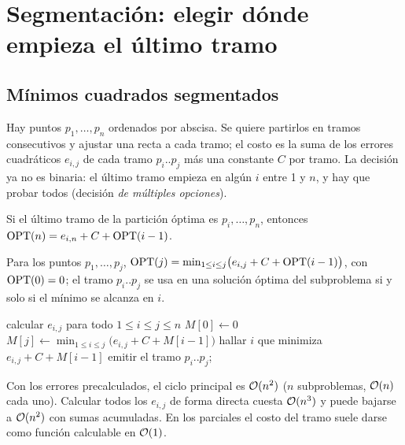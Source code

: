 \section{Segmentación: elegir dónde empieza el último tramo}

\subsection{Mínimos cuadrados segmentados}

Hay puntos $p_1,\dots,p_n$ ordenados por abscisa. Se quiere partirlos en
tramos consecutivos y ajustar una recta a cada tramo; el costo es la suma de
los errores cuadráticos $e_{i,j}$ de cada tramo $p_i..p_j$ más una constante
$C$ por tramo. La decisión ya no es binaria: el último tramo empieza en
algún $i$ entre 1 y $n$, y hay que probar todos (decisión \emph{de múltiples
opciones}).

\begin{resultado}[(6.6)]
Si el último tramo de la partición óptima es $p_i,\dots,p_n$, entonces
$\mathrm{OPT}(n)=e_{i,n}+C+\mathrm{OPT}(i-1)$.
\end{resultado}

\begin{resultado}[(6.7)]
Para los puntos $p_1,\dots,p_j$,
$\mathrm{OPT}(j)=\min_{1\le i\le j}\bigl(e_{i,j}+C+\mathrm{OPT}(i-1)\bigr)$, con
$\mathrm{OPT}(0)=0$; el tramo $p_i..p_j$ se usa en una solución óptima del
subproblema si y solo si el mínimo se alcanza en $i$.
\end{resultado}

\begin{algorithmic}[1]
\State calcular $e_{i,j}$ para todo $1\le i\le j\le n$
\State $M[0]\gets 0$
  \State $M[j]\gets\min_{1\le i\le j}\bigl(e_{i,j}+C+M[i-1]\bigr)$
\EndFor
\Statex
{}
    \State hallar $i$ que minimiza $e_{i,j}+C+M[i-1]$
    \State emitir el tramo $p_i..p_j$;\ 
  \EndIf
\EndFunction
\end{algorithmic}

Con los errores precalculados, el ciclo principal es $\mathcal{O}(n^2)$ ($n$
subproblemas, $\mathcal{O}(n)$ cada uno). Calcular todos los $e_{i,j}$ de forma
directa cuesta $\mathcal{O}(n^3)$ y puede bajarse a $\mathcal{O}(n^2)$ con sumas
acumuladas. En los parciales el costo del tramo suele darse como función
calculable en $\mathcal{O}(1)$.

